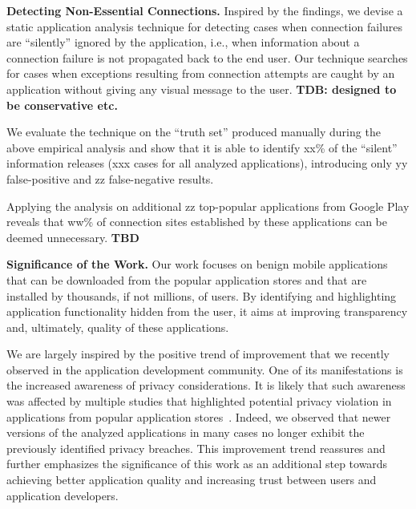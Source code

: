 

\vspace{0.1in}
\noindent 
{\bf Detecting Non-Essential Connections.}
Inspired by the findings, we devise a static application analysis technique for detecting cases when connection failures are
``silently''  ignored by the application, i.e., when information about a connection failure is not propagated back to the end user.
Our technique searches for cases when exceptions resulting from connection attempts are caught by an application without giving any visual message to the user. 
{\bf TDB: designed to be conservative etc.}

We evaluate the technique on the ``truth set'' produced manually during the above empirical analysis and show that it is able to identify xx\% of the ``silent'' information releases (xxx cases for all analyzed applications), introducing only yy false-positive and zz false-negative results. 

Applying the analysis on additional zz top-popular applications from Google Play reveals that ww\% of connection sites established by these applications can be deemed unnecessary.
{\bf TBD}


\vspace{0.1in}
\noindent 
{\bf Significance of the Work.}
Our work focuses on benign  mobile applications that can be downloaded from the popular application stores and that are installed by thousands, if not millions, of users.
By identifying and highlighting application functionality hidden from the user, it aims at improving transparency and, ultimately, quality of these applications. 
 
We are largely inspired by the positive trend of improvement that we recently observed in the application development community.
One of its manifestations is the increased awareness of privacy considerations. It is likely that such awareness was affected by multiple studies that highlighted
potential privacy violation in applications from popular application stores~\cite{Enck:Gilbert:Chun:Cox:Jung:McDaniel:Sheth:OSDI10, Egele:Kruegel:Kirda:Vign:NDSS11,Tripp:Rubin:SEC14}.
Indeed, we observed that newer versions of the analyzed applications in many cases no longer exhibit the previously identified privacy breaches.  
This improvement trend reassures and further emphasizes the significance of this work as an additional step towards achieving better application quality and increasing trust between users and application developers. 



